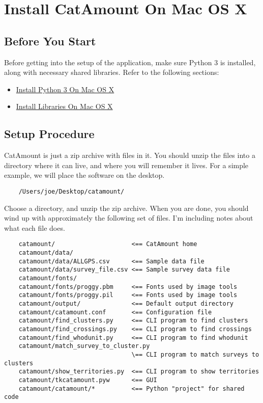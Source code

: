 \chapter{Install CatAmount On Mac OS X}
\hypertarget{macosx-install-catamount}{}

\section{Before You Start}

Before getting into the setup of the application, make sure Python 3
is installed, along with necessary shared libraries. Refer to the
following sections:

\begin{itemize}
\item \hyperlink{macosx-install-python}{Install Python 3 On Mac OS X}
\item \hyperlink{macosx-install-libraries}{Install Libraries On Mac OS X}
\end{itemize}

\section{Setup Procedure}

CatAmount is just a zip archive with files in it. You should unzip
the files into a directory where it can live, and where you will
remember it lives. For a simple example, we will place the software
on the desktop.

\begin{verbatim}
    /Users/joe/Desktop/catamount/
\end{verbatim}

Choose a directory, and unzip the zip archive. When you are done,
you should wind up with approximately the following set of files.
I'm including notes about what each file does.

\begin{verbatim}
    catamount/                     <== CatAmount home
    catamount/data/
    catamount/data/ALLGPS.csv      <== Sample data file
    catamount/data/survey_file.csv <== Sample survey data file
    catamount/fonts/
    catamount/fonts/proggy.pbm     <== Fonts used by image tools
    catamount/fonts/proggy.pil     <== Fonts used by image tools
    catamount/output/              <== Default output directory
    catamount/catamount.conf       <== Configuration file
    catamount/find_clusters.py     <== CLI program to find clusters
    catamount/find_crossings.py    <== CLI program to find crossings
    catamount/find_whodunit.py     <== CLI program to find whodunit
    catamount/match_survey_to_cluster.py
                                   \== CLI program to match surveys to clusters
    catamount/show_territories.py  <== CLI program to show territories
    catamount/tkcatamount.pyw      <== GUI
    catamount/catamount/*          <== Python "project" for shared code
\end{verbatim}


